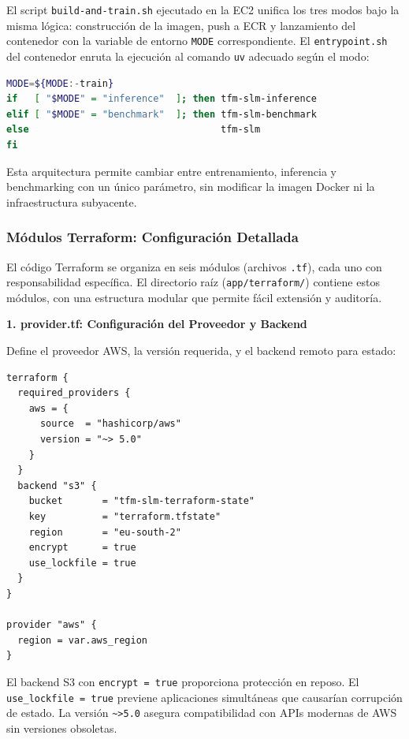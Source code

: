 El script \texttt{build-and-train.sh} ejecutado en la EC2 unifica los tres modos bajo la misma lógica: construcción de la imagen, push a ECR y lanzamiento del contenedor con la variable de entorno \texttt{MODE} correspondiente. El \texttt{entrypoint.sh} del contenedor enruta la ejecución al comando \texttt{uv} adecuado según el modo:

\begin{lstlisting}[language=bash, caption={Enrutamiento de modos en entrypoint.sh.}]
MODE=${MODE:-train}
if   [ "$MODE" = "inference"  ]; then tfm-slm-inference
elif [ "$MODE" = "benchmark"  ]; then tfm-slm-benchmark
else                                  tfm-slm
fi
\end{lstlisting}

Esta arquitectura permite cambiar entre entrenamiento, inferencia y benchmarking con un único parámetro, sin modificar la imagen Docker ni la infraestructura subyacente.

\subsubsection{Módulos Terraform: Configuración Detallada}

El código Terraform se organiza en seis módulos (archivos \texttt{.tf}), cada uno con responsabilidad específica. El directorio raíz (\texttt{app/terraform/}) contiene estos módulos, con una estructura modular que permite fácil extensión y auditoría.

\textbf{1. provider.tf: Configuración del Proveedor y Backend}

Define el proveedor AWS, la versión requerida, y el backend remoto para estado:

\begin{lstlisting}[language=hcl, caption={provider.tf: configuración de proveedor y backend remoto}]
terraform {
  required_providers {
    aws = {
      source  = "hashicorp/aws"
      version = "~> 5.0"
    }
  }
  backend "s3" {
    bucket       = "tfm-slm-terraform-state"
    key          = "terraform.tfstate"
    region       = "eu-south-2"
    encrypt      = true
    use_lockfile = true
  }
}

provider "aws" {
  region = var.aws_region
}
\end{lstlisting}

El backend S3 con \texttt{encrypt = true} proporciona protección en reposo. El \texttt{use\_lockfile = true} previene aplicaciones simultáneas que causarían corrupción de estado. La versión \texttt{\textasciitilde{}>5.0} asegura compatibilidad con APIs modernas de AWS sin versiones obsoletas.

